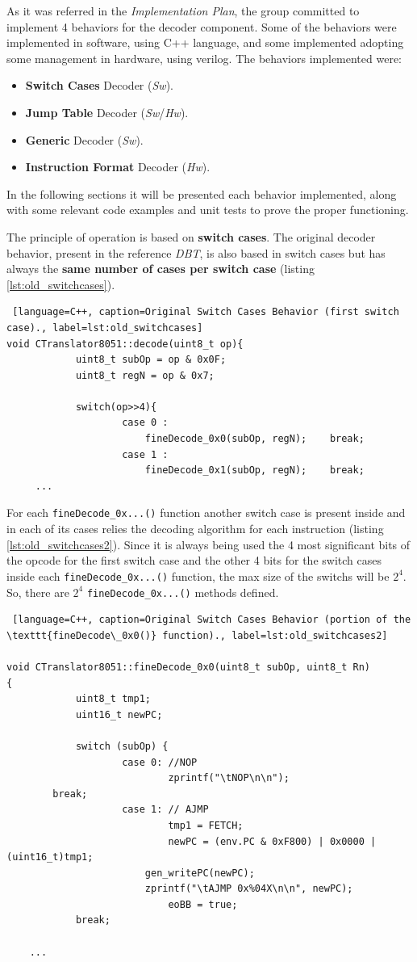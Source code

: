 As it was referred in the \textit{Implementation Plan},  the group committed to implement 4 behaviors for the decoder component. Some of the behaviors were implemented in software, using C++ language, and some implemented adopting some management in hardware, using verilog. The behaviors implemented were:

\begin{itemize}
	\item \textbf{Switch Cases} Decoder (\textit{Sw}).
    \item \textbf{Jump Table} Decoder (\textit{Sw}/\textit{Hw}).
    \item \textbf{Generic} Decoder (\textit{Sw}).
    \item \textbf{Instruction Format} Decoder (\textit{Hw}).
\end{itemize}

In the following sections it will be presented each behavior implemented, along with some relevant code examples and unit tests to prove the proper functioning.


The principle of operation is based on \textbf{switch cases}.
The original decoder behavior, present in the reference \textit{DBT}, is also based in switch cases but has always the \textbf{same number of cases per switch case} (listing \ref{lst:old_switchcases}).

\begin{lstlisting} [language=C++, caption=Original Switch Cases Behavior (first switch case)., label=lst:old_switchcases]
void CTranslator8051::decode(uint8_t op){
			uint8_t subOp = op & 0x0F;
			uint8_t regN = op & 0x7;	

			switch(op>>4){
					case 0 :
						fineDecode_0x0(subOp, regN);	break;
					case 1 :
						fineDecode_0x1(subOp, regN);	break; 
     ...   
\end{lstlisting}

For each \texttt{fineDecode\_0x...()} function another switch case is present inside and in each of its cases relies the decoding algorithm for each instruction (listing \ref{lst:old_switchcases2}). Since it is always being used the 4 most significant bits of the opcode for the first switch case and the other 4 bits for the switch cases inside each \texttt{fineDecode\_0x...()} function, the max size of the switchs will be $2^{4}$. So, there are $2^{4}$ \texttt{fineDecode\_0x...()} methods defined.

\begin{lstlisting} [language=C++, caption=Original Switch Cases Behavior (portion of the \texttt{fineDecode\_0x0()} function)., label=lst:old_switchcases2]

void CTranslator8051::fineDecode_0x0(uint8_t subOp, uint8_t Rn)
{
			uint8_t tmp1;
			uint16_t newPC;
		
			switch (subOp) {
					case 0: //NOP
							zprintf("\tNOP\n\n");
	  	break;
					case 1: // AJMP
							tmp1 = FETCH;
							newPC = (env.PC & 0xF800) | 0x0000 | (uint16_t)tmp1; 
	    				gen_writePC(newPC);		
	    				zprintf("\tAJMP 0x%04X\n\n", newPC);
							eoBB = true;		
			break;
		
    ...

\end{lstlisting}

